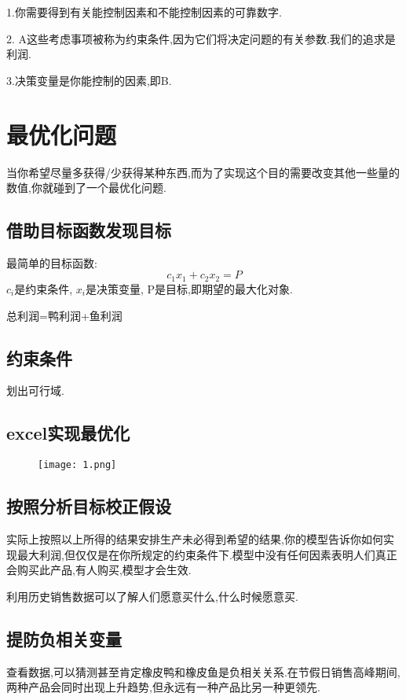 \documentclass[11pt,a4paper,oneside]{book}
\begin{document}
\begin{tcolorbox}[colback=pink!10!white,colframe=pink!100!black]
1.你需要得到有关能控制因素和不能控制因素的可靠数字.

2. A这些考虑事项被称为约束条件,因为它们将决定问题的有关参数.我们的追求是利润.

3.决策变量是你能控制的因素,即B.
\end{tcolorbox}
\section{最优化问题}

当你希望尽量多获得/少获得某种东西,而为了实现这个目的需要改变其他一些量的数值,你就碰到了一个最优化问题.

\subsection{借助目标函数发现目标}
最简单的目标函数:
\begin{equation}
c_1x_1+c_2x_2=P
\end{equation}
$c_i$是约束条件, $x_i$是决策变量, P是目标,即期望的最大化对象.

总利润=鸭利润+鱼利润
\subsection{约束条件}
划出可行域.

\subsection{excel实现最优化}
\begin{figure}[H]
	\centering
	\texttt{[image: 1.png]}  
\end{figure}
\subsection{按照分析目标校正假设}
实际上按照以上所得的结果安排生产未必得到希望的结果,你的模型告诉你如何实现最大利润,但仅仅是在你所规定的约束条件下.模型中没有任何因素表明人们真正会购买此产品,有人购买,模型才会生效.

利用历史销售数据可以了解人们愿意买什么,什么时候愿意买.
\subsection{提防负相关变量}
查看数据,可以猜测甚至肯定橡皮鸭和橡皮鱼是负相关关系.在节假日销售高峰期间,两种产品会同时出现上升趋势,但永远有一种产品比另一种更领先.
\end{document}
